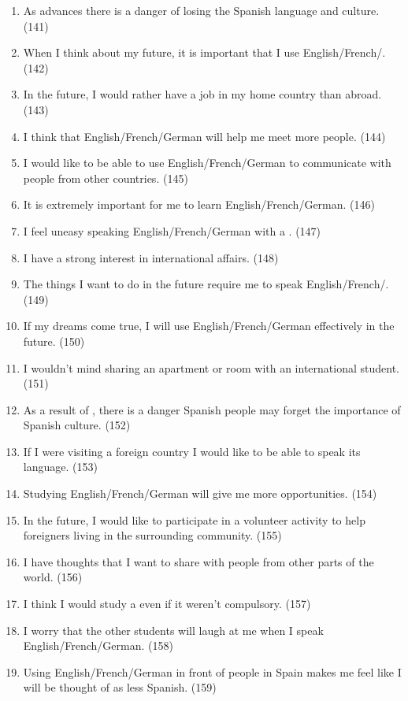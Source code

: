 \documentclass[output=paper]{langsci/langscibook}
\begin{document}
\begin{enumerate}
\item  As  advances there is a danger of losing the {Spanish} language and culture. (141)
\item  When I think about my future, it is important that I use {English}/French/. (142)
\item  In the future, I would rather have a job in my home country than abroad. (143)
\item  I think that {English}/French/{German} will help me meet more people. (144)
\item  I would like to be able to use {English}/French/{German} to communicate with people from other countries. (145)
\item  It is extremely important for me to learn {English}/French/{German}. (146)
\item  I feel uneasy speaking {English}/French/{German} with a . (147)
\item  I have a strong interest in international affairs. (148)
\item  The things I want to do in the future require me to speak {English}/French/. (149)
\item  If my dreams come true, I will use {English}/French/{German} effectively in the future. (150)
\item  I wouldn't mind sharing an apartment or room with an international student. (151)
\item  As a result of , there is a danger {Spanish} people may forget the importance of {Spanish} culture. (152)
\item  If I were visiting a foreign country I would like to be able to speak its language. (153)
\item  Studying {English}/French/{German} will give me more opportunities. (154)
\item  In the future, I would like to participate in a volunteer activity to help foreigners living in the surrounding community. (155)
\item  I have thoughts that I want to share with people from other parts of the world. (156)
\item  I think I would study a  even if it weren’t compulsory. (157)
\item  I worry that the other students will laugh at me when I speak {English}/French/{Ger\-man}. (158)
\item  Using {English}/French/{German} in front of people in Spain makes me feel like I will be thought of as less {Spanish}. (159)

\end{enumerate}
\end{document}
